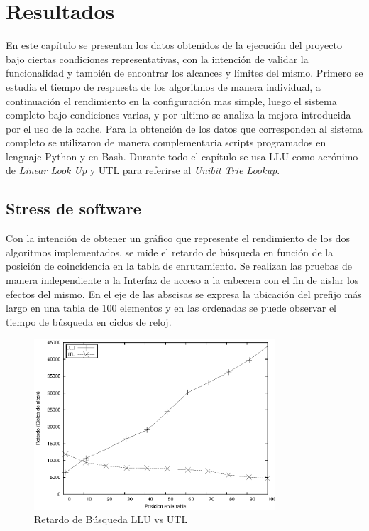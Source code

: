 \chapter{Resultados}

En este capítulo se presentan los datos obtenidos de la ejecución del proyecto bajo ciertas condiciones representativas, con la intención de validar la funcionalidad y también de encontrar los alcances y límites del mismo. Primero se estudia el tiempo de respuesta de los algoritmos de manera individual, a continuación el rendimiento en la configuración mas simple, luego el sistema completo bajo condiciones varias, y por ultimo se analiza la mejora introducida por el uso de la cache. Para la obtención de los datos que corresponden al sistema completo se utilizaron de manera complementaria scripts programados en lenguaje Python y en Bash. Durante todo el capítulo se usa LLU como acrónimo de \textit{Linear Look Up} y UTL para referirse al \textit{Unibit Trie Lookup}. 


\section{Stress de software}

Con la intención de obtener un gráfico que represente el rendimiento de los dos algoritmos implementados, se mide el retardo de búsqueda en función de la posición de coincidencia en la tabla de enrutamiento. Se realizan las pruebas de manera independiente a la Interfaz de acceso a la cabecera con el fin de aislar los efectos del mismo. En el eje de las abscisas se expresa la ubicación del prefijo más largo en una tabla de 100 elementos  y en las ordenadas se puede observar el tiempo de búsqueda en ciclos de reloj.

\begin{figure}[h]
  \centering
	\includegraphics[width=0.8\textwidth]{5-resultados/graf/llu-utlsof.eps}
  \caption{Retardo de Búsqueda LLU vs UTL}
  \label{fig}
\end{figure}

